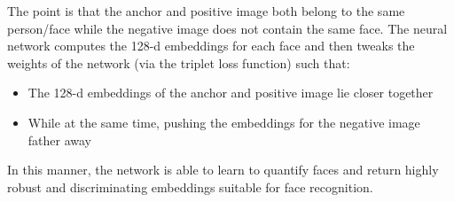     The point is that the anchor and positive image both belong to the same person/face while the negative image does not contain the same face. The neural network computes the 128-d 
    embeddings for each face and then tweaks the weights of the network (via the triplet loss function) such that:
    \begin{itemize}
        \item The 128-d embeddings of the anchor and positive image lie closer together
        \item While at the same time, pushing the embeddings for the negative image father away
    \end{itemize}
    In this manner, the network is able to learn to quantify faces and return highly robust and discriminating embeddings suitable for face recognition.

